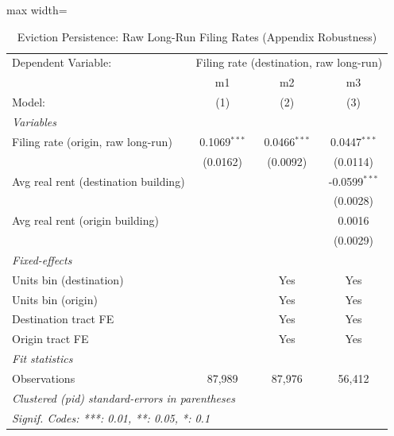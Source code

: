\documentclass[
  11pt,
]{article}
\begin{document}
\begin{table}[htbp]
\centering
\caption{\label{tab:evict_persist_raw} Eviction Persistence: Raw Long-Run Filing Rates (Appendix Robustness)}
\centering

\begin{adjustbox}{max width=\textwidth}
   \begin{tabular}{lccc}
      \tabularnewline \midrule \midrule
      Dependent Variable: & \multicolumn{3}{c}{Filing rate (destination, raw long-run)}\\
                                           & m1             & m2             & m3 \\   
      Model:                               & (1)            & (2)            & (3)\\  
      \midrule
      \emph{Variables}\\
      Filing rate (origin, raw long-run)   & 0.1069$^{***}$ & 0.0466$^{***}$ & 0.0447$^{***}$\\   
                                           & (0.0162)       & (0.0092)       & (0.0114)\\   
      Avg real rent (destination building) &                &                & -0.0599$^{***}$\\   
                                           &                &                & (0.0028)\\   
      Avg real rent (origin building)      &                &                & 0.0016\\   
                                           &                &                & (0.0029)\\   
      \midrule
      \emph{Fixed-effects}\\
      Units bin (destination)              &                & Yes            & Yes\\  
      Units bin (origin)                   &                & Yes            & Yes\\  
      Destination tract FE                 &                & Yes            & Yes\\  
      Origin tract FE                      &                & Yes            & Yes\\  
      \midrule
      \emph{Fit statistics}\\
      Observations                         & 87,989         & 87,976         & 56,412\\  
      \midrule \midrule
      \multicolumn{4}{l}{\emph{Clustered (pid) standard-errors in parentheses}}\\
      \multicolumn{4}{l}{\emph{Signif. Codes: ***: 0.01, **: 0.05, *: 0.1}}\\
   \end{tabular}

\end{adjustbox}
\end{table}
\end{document}
